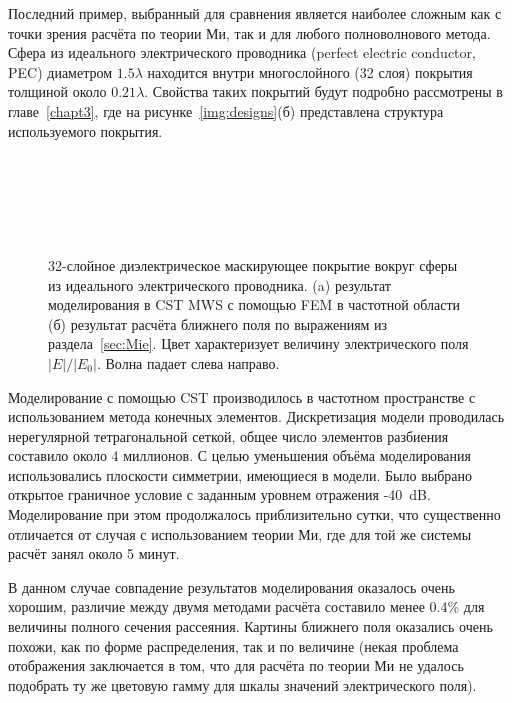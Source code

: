 Последний пример, выбранный для сравнения является наиболее сложным
как с точки зрения расчёта по теории Ми, так и для любого
полноволнового метода. Сфера из идеального электрического проводника
(perfect electric conductor, PEC) диаметром $1.5\lambda$ находится
внутри многослойного (32 слоя) покрытия толщиной около
$0.21\lambda$. Свойства таких покрытий будут подробно рассмотрены в
главе~\ref{chapt3}, где на рисунке~\ref{img:designs}(б) представлена
структура используемого покрытия.
\begin{figure}[p] 
  \begin{minipage}[ht]{0.99\linewidth}
  \end{minipage}\\
  \vfill
  \begin{minipage}[ht]{0.99\linewidth}
  \end{minipage}\\
  \vfill
  \begin{minipage}[ht]{0.95\linewidth}
  \end{minipage}\\
  \vfill
  \begin{minipage}[ht]{0.99\linewidth}
  \end{minipage}
  \caption{32-слойное диэлектрическое маскирующее покрытие вокруг
    сферы из идеального электрического проводника. (a) результат
    моделирования в CST MWS с помощью FEM в частотной области (б)
    результат расчёта ближнего поля по выражениям из
    раздела~\ref{sec:Mie}. Цвет характеризует величину электрического
    поля $|E|/|E_0|$. Волна падает слева направо.\label{img:e32layer}}
\end{figure}

Моделирование с помощью CST производилось в частотном пространстве с
использованием метода конечных элементов. Дискретизация модели
проводилась нерегулярной тетрагональной сеткой, общее число элементов
разбиения составило около 4 миллионов.  С целью уменьшения объёма
моделирования использовались плоскости симметрии, имеющиеся в
модели. Было выбрано открытое граничное условие с заданным уровнем
отражения -40~dB. Моделирование при этом продолжалось приблизительно сутки,
что существенно отличается от случая с использованием теории
Ми, где для той же системы расчёт занял около 5 минут.

В данном случае совпадение результатов моделирования оказалось очень
хорошим, различие между двумя методами расчёта составило менее 0.4\%
для величины полного сечения рассеяния. Картины ближнего поля
оказались очень похожи, как по форме распределения, так и по 
величине (некая проблема отображения заключается в том, что для
расчёта по теории Ми не удалось подобрать ту же цветовую гамму для
шкалы значений электрического поля).

